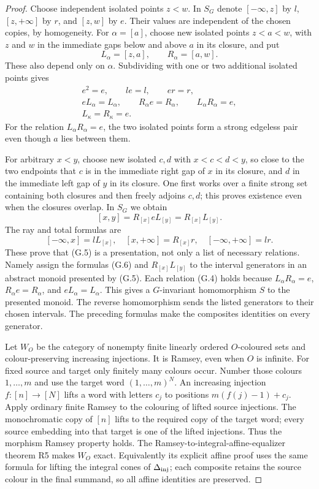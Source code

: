 \begin{proof}
Choose independent isolated points $z<w$.  In $S_G$ denote
$[-\infty,z]$ by $l$, $[z,+\infty]$ by $r$, and $[z,w]$ by
$e$.  Their values are independent of the chosen copies, by
homogeneity.  For $\alpha=[a]$, choose new isolated points
$z<a<w$, with $z$ and $w$ in the immediate gaps below and above
$a$ in its closure, and put
\[
 L_\alpha=[z,a],\qquad R_\alpha=[a,w].
\]
These also depend only on $\alpha$.  Subdividing with one or two
additional isolated points gives
\[
\begin{gathered}
 e^2=e,\qquad le=l,\qquad er=r,\\
 eL_\alpha=L_\alpha,\qquad R_\alpha e=R_\alpha,
 \qquad L_\alpha R_\alpha=e,\\
 L_\kappa=R_\kappa=e.
\end{gathered}
\tag{G.5}
\]
For the relation $L_\alpha R_\alpha=e$, the two isolated points
form a strong edgeless pair even though $a$ lies between them.

For arbitrary $x<y$, choose new isolated $c,d$ with
$x<c<d<y$, so close to the two endpoints that $c$ is in the
immediate right gap of $x$ in its closure, and $d$ in the
immediate left gap of $y$ in its closure.  One first works over
a finite strong set containing both closures and then freely
adjoins $c,d$; this proves existence even when the closures
overlap.  In $S_G$ we obtain
\[
 [x,y]=R_{[x]}eL_{[y]}=R_{[x]}L_{[y]}.
\]
The ray and total formulas are
\[
 [-\infty,x]=lL_{[x]},\quad
 [x,+\infty]=R_{[x]}r,\quad
 [-\infty,+\infty]=lr.
 \tag{G.6}
\]
These prove that (G.5) is a presentation, not only a list of
necessary relations.  Namely assign the formulas (G.6) and
$R_{[x]}L_{[y]}$ to the interval generators in an abstract monoid
presented by (G.5).  Each relation (G.4) holds because
$L_\alpha R_\alpha=e$, $R_\alpha e=R_\alpha$, and
$eL_\alpha=L_\alpha$.  This gives a $G$-invariant homomorphism
$S$ to the presented monoid.  The reverse homomorphism sends the
listed generators to their chosen intervals.  The preceding
formulas make the composites identities on every generator.

Let $W_O$ be the category of nonempty finite linearly ordered
$O$-coloured sets and colour-preserving increasing injections.
It is Ramsey, even when $O$ is infinite.  For fixed source and
target only finitely many colours occur.  Number those colours
$1,\ldots,m$ and use the target word $(1,\ldots,m)^N$.
An increasing injection $f:[n]\to[N]$ lifts a word with letters
$c_j$ to positions $m(f(j)-1)+c_j$.  Apply ordinary finite Ramsey
to the colouring of lifted source injections.  The monochromatic
copy of $[n]$ lifts to the required copy of the target word;
every source embedding into that target is one of the lifted
injections.  Thus the morphism Ramsey property holds.  The
Ramsey-to-integral-affine-equalizer theorem R5 makes $W_O$ exact.
Equivalently its explicit affine proof uses the same formula for
lifting the integral cones of $\Delta_{\rm inj}$; each composite
retains the source colour in the final summand, so all affine
identities are preserved.


\end{proof}
